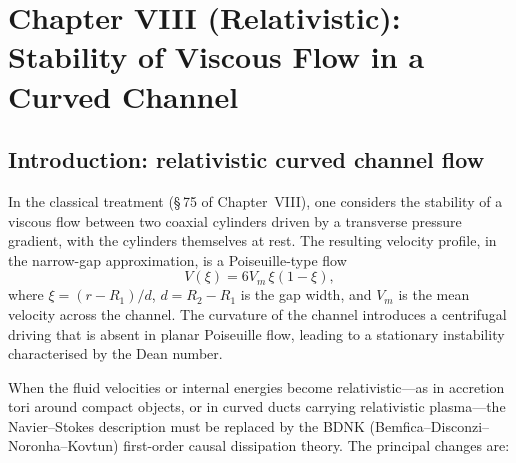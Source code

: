 %

\chapter*{Chapter VIII (Relativistic): Stability of Viscous Flow in a
  Curved Channel}

\section{Introduction: relativistic curved channel flow}
\label{sec:rel-75}

In the classical treatment (\S\,75 of Chapter~VIII), one considers the
stability of a viscous flow between two coaxial cylinders driven by a
transverse pressure gradient, with the cylinders themselves at rest.  The
resulting velocity profile, in the narrow-gap approximation, is a
Poiseuille-type flow
\begin{equation}
\label{eq:rel-8-1}
V(\xi) = 6V_m\,\xi(1 - \xi),
\end{equation}
where $\xi = (r - R_1)/d$, $d = R_2 - R_1$ is the gap width, and $V_m$
is the mean velocity across the channel.  The curvature of the channel
introduces a centrifugal driving that is absent in planar Poiseuille flow,
leading to a stationary instability characterised by the Dean number.

When the fluid velocities or internal energies become relativistic---as
in accretion tori around compact objects, or in curved ducts carrying
relativistic plasma---the Navier--Stokes description must be replaced by
the BDNK (Bemfica--Disconzi--Noronha--Kovtun) first-order causal
dissipation theory.  The principal changes are:

